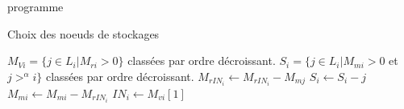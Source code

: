 \documentclass[10pt, c]{beamer}
\begin{document}
            \begin{frame}{programme}
                \begin{algorithm}[H]
                    \caption{Choix des noeuds de stockages}
                    \begin{algorithmic}
                        \STATE $M_{Vi} = \{ j \in L_i | M_{ri} > 0 \}$ classées par ordre décroissant.
                        \STATE $S_{i} = \{ j \in L_i | M_{mi} >0$ et $j >^{\alpha} i \} $ classées par ordre décroissant.
                        \STATE $ M_{rIN_{i}} \leftarrow M_{rIN_{i}} - M_{mj}$
                        \STATE $ S_i \leftarrow S_i - {j}$
                        \ENDIF
                        \ENDWHILE
                                  \STATE $ M_{mi} \leftarrow M_{mi} - M_{rIN_{i}}$
                                  \STATE $IN_i \leftarrow M_{vi}[1]$
                            \ENDIF
                        \ENDIF
                    \end{algorithmic}
                \end{algorithm}
            \end{frame}
\end{document}
